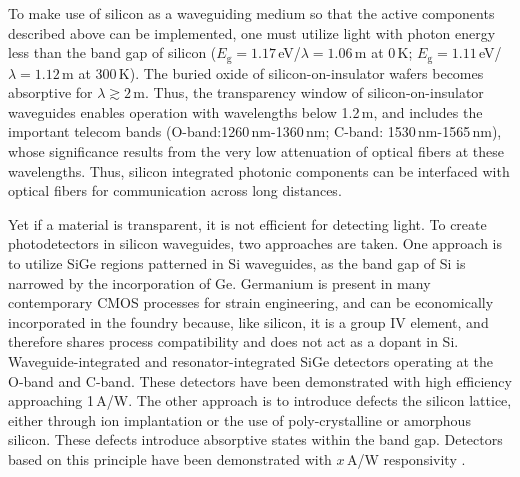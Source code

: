 \documentclass[twocolumn]{article}
\begin{document}
To make use of silicon as a waveguiding medium so that the active components described above can be implemented, one must utilize light with photon energy less than the band gap of silicon ($E_{\mathrm{g}}=1.17$\,eV/$\lambda = 1.06$\,\textmu m at 0\,K; $E_{\mathrm{g}}=1.11$\,eV/$\lambda = 1.12$\,\textmu m at 300\,K). The buried oxide of silicon-on-insulator wafers becomes absorptive for $\lambda \gtrsim 2$\,\textmu m. Thus, the transparency window of silicon-on-insulator waveguides enables operation with wavelengths below 1.2\,\textmu m, and includes the important telecom bands (O-band:1260\,nm-1360\,nm; C-band: 1530\,nm-1565\,nm), whose significance results from the very low attenuation of optical fibers at these wavelengths. Thus, silicon integrated photonic components can be interfaced with optical fibers for communication across long distances. 

Yet if a material is transparent, it is not efficient for detecting light. To create photodetectors in silicon waveguides, two approaches are taken. One approach is to utilize SiGe regions patterned in Si waveguides, as the band gap of Si is narrowed by the incorporation of Ge. Germanium is present in many contemporary CMOS processes for strain engineering, and can be economically incorporated in the foundry because, like silicon, it is a group IV element, and therefore shares process compatibility and does not act as a dopant in Si. Waveguide-integrated \cite{} and resonator-integrated \cite{} SiGe detectors operating at the O-band and C-band. These detectors have been demonstrated with high efficiency approaching 1\,A/W. The other approach is to introduce defects the silicon lattice, either through ion implantation or the use of poly-crystalline or amorphous silicon. These defects introduce absorptive states within the band gap. Detectors based on this principle have been demonstrated with $x$\,A/W responsivity \cite{meor2014}. 
\end{document}
